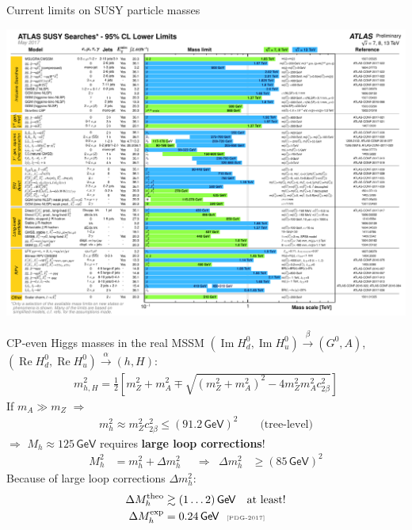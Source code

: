 \documentclass[hyperref={pdfpagelabels=false},ngerman]{beamer}
\newcommand{\eh}[1]{\,\mathsf{#1}}
\newcommand{\mycite}[1]{\ensuremath{\text{\textcolor{darkgray}{\tiny [#1]}}}}
\DeclareMathOperator{\re}{Re}
\DeclareMathOperator{\im}{Im}
\renewcommand{\emph}{\textbf}
\begin{document}
\begin{frame}{Current limits on SUSY particle masses}
  \begin{center}
    \includegraphics[width=\textwidth]{images/ATLAS_SUSY_Summary}
  \end{center}
\end{frame}

\begin{frame}{CP-even Higgs masses in the real MSSM}
  $\left(\im H_d^0, \im H_u^0\right) \overset{\beta}{\rightarrow} (G^0, A)$,
  $\left(\re H_d^0, \re H_u^0\right) \overset{\alpha}{\rightarrow} (h, H)$:
  \begin{align*}
    m_{h,H}^2 = \frac{1}{2} \left[
      m_Z^2 + m_A^2 \mp \sqrt{(m_Z^2 + m_A^2)^2 - 4 m_Z^2 m_A^2 c_{2\beta}^2}
    \right]
  \end{align*}
  If $m_A \gg m_Z$ $\Rightarrow$
  \begin{align*}
    m_h^2 \approx m_Z^2 c_{2\beta}^2
    \leq (91.2 \eh{GeV})^2  \qquad \text{(tree-level)}
  \end{align*}
  $\Rightarrow$ $M_h \approx 125\eh{GeV}$ requires \emph{large loop
    corrections}!
  \begin{align*}
    M_h^2 &= m_h^2 + \Delta m_h^2
    & &\Rightarrow &
    \Delta m_h^2 &\geq (85\eh{GeV})^2
  \end{align*}
  Because of large loop corrections $\Delta m_h^2$:
  \begin{align*}
    \Delta M_h^{\text{theo}} &\gtrsim (1\ldots 2)\eh{GeV} \quad \text{at least!} \\
    \Delta M_h^{\text{exp}} &= 0.24\eh{GeV} \ \ \mycite{PDG-2017}
  \end{align*}
\end{frame}
\end{document}
